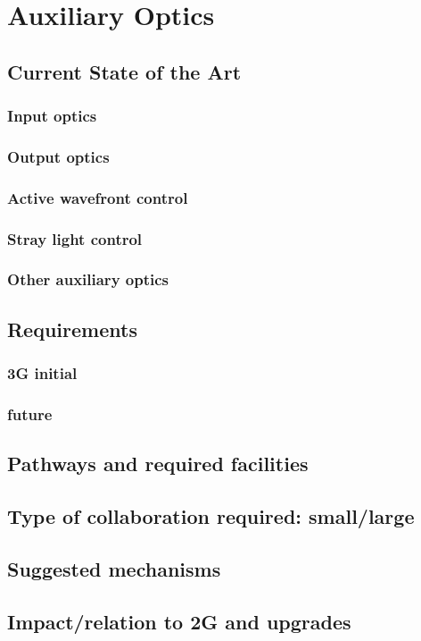 \section{Auxiliary Optics}
\subsection{Current State of the Art}
\subsubsection{Input optics}
\subsubsection{Output optics}
\subsubsection{Active wavefront control}
\subsubsection{Stray light control}
\subsubsection{Other auxiliary optics}

\subsection{Requirements}
\subsubsection{3G initial}
\subsubsection{future}
\subsection{Pathways and required facilities}
\subsection{Type of collaboration required:  small/large}
\subsection{Suggested mechanisms}
\subsection{Impact/relation to 2G and upgrades}